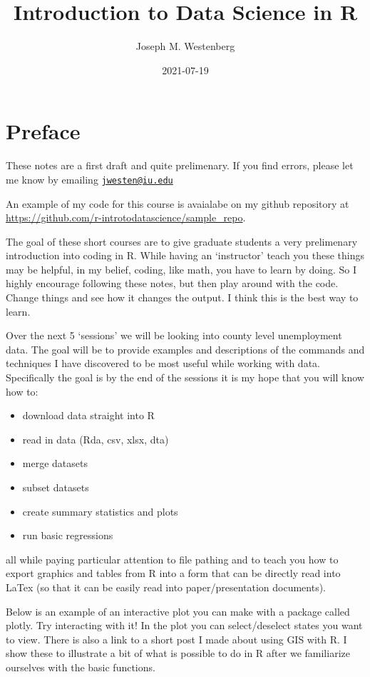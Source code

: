 \documentclass[
]{book}
\title{Introduction to Data Science in R}
\author{Joseph M. Westenberg}
\date{2021-07-19}
\providecommand{\tightlist}{%
  \setlength{\itemsep}{0pt}\setlength{\parskip}{0pt}}
\begin{document}
\maketitle

{
\setcounter{tocdepth}{1}
\tableofcontents
}
\hypertarget{preface}{%
\chapter{Preface}\label{preface}}

These notes are a first draft and quite prelimenary. If you find errors, please let me know by emailing \href{mailto:jwesten@iu.edu}{\nolinkurl{jwesten@iu.edu}}

An example of my code for this course is avaialabe on my github repository at \url{https://github.com/r-introtodatascience/sample_repo}.

The goal of these short courses are to give graduate students a very prelimenary introduction into coding in R. While having an `instructor' teach you these things may be helpful, in my belief, coding, like math, you have to learn by doing. So I highly encourage following these notes, but then play around with the code. Change things and see how it changes the output. I think this is the best way to learn.

Over the next 5 `sessions' we will be looking into county level unemployment data. The goal will be to provide examples and descriptions of the commands and techniques I have discovered to be most useful while working with data. Specifically the goal is by the end of the sessions it is my hope that you will know how to:

\begin{itemize}
\tightlist
\item
  download data straight into R
\item
  read in data (Rda, csv, xlsx, dta)
\item
  merge datasets
\item
  subset datasets
\item
  create summary statistics and plots
\item
  run basic regressions
\end{itemize}

all while paying particular attention to file pathing and to teach you how to export graphics and tables from R into a form that can be directly read into LaTex (so that it can be easily read into paper/presentation documents).

Below is an example of an interactive plot you can make with a package called plotly. Try interacting with it! In the plot you can select/deselect states you want to view. There is also a link to a short post I made about using GIS with R. I show these to illustrate a bit of what is possible to do in R after we familiarize ourselves with the basic functions.
\end{document}
